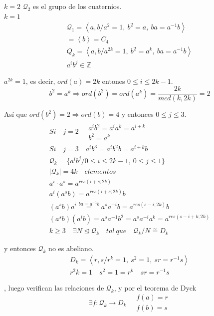 \documentclass{article}
\begin{document}
$k=2$ $\mathcal{Q}_2$ es el grupo de los cuaternios.\\

$k=1$
\begin{gather*}
\mathcal{Q}_1=\left\langle a,b/a^2=1,\:b^2=a,\:ba=a^{-1}b\right\rangle \\
=\left\langle b\right\rangle =C_4 \\
Q_k=\left\langle a,b/a^{2k}=1,\:b^2=a^k,\:ba=a^{-1}b\right\rangle \\
a^ib^j\in \mathbb{Z}
\end{gather*}

$a^{2k}=1$, es decir, $ord(a)=2k$ entones $0\leq i\leq 2k-1$.
\begin{equation*}
b^2=a^k \Rightarrow ord(b^2)=ord(a^k)=\frac{2k}{mcd(k,2k)}=2
\end{equation*}

Así que $ord(b^2)=2\Rightarrow ord(b)=4$ y entonces $0\leq j\leq 3$.
\begin{gather*}
Si\quad j=2\quad \left.\begin{array}{c}
a^ib^2=a^ia^k=a^{i+k}\\
b^2=a^k
\end{array}\right.\\
Si\quad j=3\quad a^ib^3=a^ib^2b=a^{i+k}b\\
\mathcal{Q}_k=\{a^ib^j/0\leq i\leq 2k-1,\:0\leq j\leq 1\} \\
|\mathcal{Q}_k|=4k\quad elementos \\
a^i\cdot a^s=a^{res(i+s;2k)}\\
a^i(a^sb)=a^{res(i+s;2k)}b\\
(a^sb)a^i\overset{ba=a^{-1}b}{=}a^sa^{-i}b=a^{res(s-i;2k)}b \\
(a^sb)(a^ib)=a^sa^{-1}b^2=a^sa^{-i}a^k=a^{res(s-i+k;2k)}\\
k\geq 3\quad \exists N\unlhd \mathcal{Q}_k\quad tal\:que\quad \mathcal{Q}_k/N\overset{\sim}{=} D_k
\end{gather*}

y entonces $\mathcal{Q}_k$ no es abeliano.
\begin{gather*}
D_k=\left\langle r,s/r^k=1,\:s^2=1,\:sr=r^{-1}s\right\rangle \\
r^2k=1\quad s^2=1=r^k \quad sr=r^{-1}s
\end{gather*}

, luego verifican las relaciones de $\mathcal{Q}_k$, y por el teorema de Dyck
\begin{equation*}
\exists f:\mathcal{Q}_k\longrightarrow D_k \quad \left.\begin{array}{c}
f(a)=r\\
f(b)=s
\end{array}\right.
\end{equation*}
\end{document}
